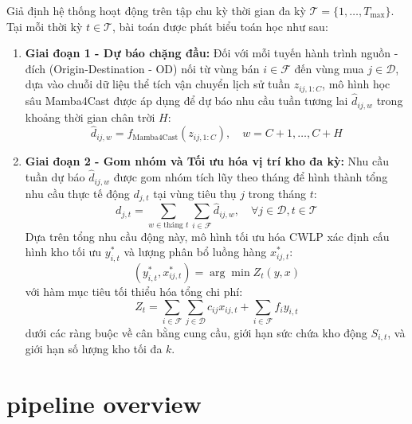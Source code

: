 Giả định hệ thống hoạt động trên tập chu kỳ thời gian đa kỳ $\mathcal{T} = \{1, \dots, T_{\text{max}}\}$. Tại mỗi thời kỳ $t \in \mathcal{T}$, bài toán được phát biểu toán học như sau:
\begin{enumerate}
    \item \textbf{Giai đoạn 1 - Dự báo chặng đầu:}
    Đối với mỗi tuyến hành trình nguồn - đích (Origin-Destination - OD) nối từ vùng bán $i \in \mathcal{F}$ đến vùng mua $j \in \mathcal{D}$, dựa vào chuỗi dữ liệu thể tích vận chuyển lịch sử tuần $z_{ij, 1:C}$, mô hình học sâu Mamba4Cast được áp dụng để dự báo nhu cầu tuần tương lai $\widehat{d}_{ij, w}$ trong khoảng thời gian chân trời $H$:
    \begin{equation}
        \widehat{d}_{ij, w} = f_{\text{Mamba4Cast}}(z_{ij, 1:C}), \quad w = C + 1, \dots, C + H
    \end{equation}
    
    \item \textbf{Giai đoạn 2 - Gom nhóm và Tối ưu hóa vị trí kho đa kỳ:}
    Nhu cầu tuần dự báo $\widehat{d}_{ij, w}$ được gom nhóm tích lũy theo tháng để hình thành tổng nhu cầu thực tế động $d_{j, t}$ tại vùng tiêu thụ $j$ trong tháng $t$:
    \begin{equation}
        d_{j, t} = \sum_{w \in \text{tháng } t} \sum_{i \in \mathcal{F}} \widehat{d}_{ij, w}, \quad \forall j \in \mathcal{D}, t \in \mathcal{T}
    \end{equation}
    Dựa trên tổng nhu cầu động này, mô hình tối ưu hóa CWLP xác định cấu hình kho tối ưu $y_{i,t}^*$ và lượng phân bổ luồng hàng $x_{ij,t}^*$:
    \begin{equation}
        (y_{i,t}^*, x_{ij,t}^*) = \arg\min Z_t(y, x)
    \end{equation}
    với hàm mục tiêu tối thiểu hóa tổng chi phí:
    \begin{equation}
        Z_t = \sum_{i \in \mathcal{F}} \sum_{j \in \mathcal{D}} c_{ij} x_{ij,t} + \sum_{i \in \mathcal{F}} f_i y_{i,t}
    \end{equation}
    dưới các ràng buộc về cân bằng cung cầu, giới hạn sức chứa kho động $S_{i,t}$, và giới hạn số lượng kho tối đa $k$.
\end{enumerate}

\section{pipeline overview}
\label{sec:pipeline_overview}

